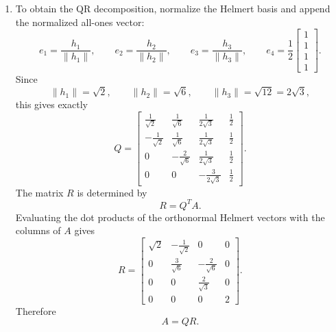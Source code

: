 \documentclass[12pt]{article}
\begin{document}
\begin{enumerate}[label=(\alph*)]
  \item To obtain the QR decomposition, normalize the Helmert basis and append the normalized all-ones vector:
  \[
  e_1=\frac{h_1}{\|h_1\|},
  \qquad
  e_2=\frac{h_2}{\|h_2\|},
  \qquad
  e_3=\frac{h_3}{\|h_3\|},
  \qquad
  e_4=\frac{1}{2}\begin{bmatrix}1\\1\\1\\1\end{bmatrix}.
  \]
  Since
  \[
  \|h_1\|=\sqrt2,
  \qquad
  \|h_2\|=\sqrt6,
  \qquad
  \|h_3\|=\sqrt{12}=2\sqrt3,
  \]
  this gives exactly
  \[
  Q=\begin{bmatrix}
  \frac1{\sqrt2}&\frac1{\sqrt6}&\frac1{2\sqrt3}&\frac12\\[0.3em]
  -\frac1{\sqrt2}&\frac1{\sqrt6}&\frac1{2\sqrt3}&\frac12\\[0.3em]
  0&-\frac2{\sqrt6}&\frac1{2\sqrt3}&\frac12\\[0.3em]
  0&0&-\frac3{2\sqrt3}&\frac12
  \end{bmatrix}.
  \]
  The matrix $R$ is determined by
  \[
  R=Q^TA.
  \]
  Evaluating the dot products of the orthonormal Helmert vectors with the columns of $A$ gives
  \[
  R=\begin{bmatrix}
  \sqrt2&-\frac1{\sqrt2}&0&0\\[0.3em]
  0&\frac3{\sqrt6}&-\frac2{\sqrt6}&0\\[0.3em]
  0&0&\frac2{\sqrt3}&0\\[0.3em]
  0&0&0&2
  \end{bmatrix}.
  \]
  Therefore
  \[
  \boxed{A=QR.}
  \]
\end{enumerate}

\newpage
\end{document}
